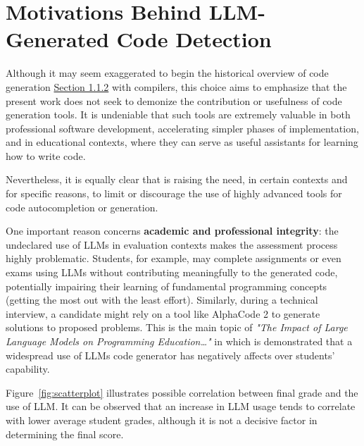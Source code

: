 \clearpage
\section{Motivations Behind LLM-Generated Code Detection}
\label{sec:Motivations Behind LLM-Generated Code Detection}
Although it may seem exaggerated to begin the historical 
overview of code generation 
\hyperref[sec:Code_Generator]{Section 1.1.2} with compilers, 
this choice aims to emphasize that the present work does not 
seek to demonize the contribution or usefulness of code 
generation tools. It is undeniable that such tools are 
extremely valuable in both professional software development, 
accelerating simpler phases of implementation, and 
in educational contexts, where they can serve as 
useful assistants for learning how to write code.

Nevertheless, it is equally clear that is raising 
the need, in certain contexts 
and for specific reasons, to limit or discourage 
the use of highly advanced tools for code autocompletion 
or generation.

\vspace{1\baselineskip}
\noindent

One important reason concerns \textbf{academic and 
professional integrity}: the undeclared use of 
LLMs in evaluation contexts makes the assessment 
process highly problematic. Students, for example, 
may complete assignments or even exams using LLMs 
without contributing meaningfully to the generated 
code, potentially impairing their learning of 
fundamental programming concepts 
(getting the most out with the least effort). Similarly, 
during a technical interview, a candidate might 
rely on a tool like AlphaCode 2 to generate solutions 
to proposed problems.
This is the main topic of
\textit{"The Impact of Large Language Models on 
Programming Education…"} \cite{Jost2024LLM}
in which is demonstrated that a widespread use of 
LLMs code generator has negatively affects 
over students' capability.

Figure~\ref{fig:scatterplot} illustrates 
possible correlation between final grade and the
use of LLM. 
It can be observed that an increase in 
LLM usage tends to correlate with lower average 
student grades, although it is not a decisive factor 
in determining the final score.


